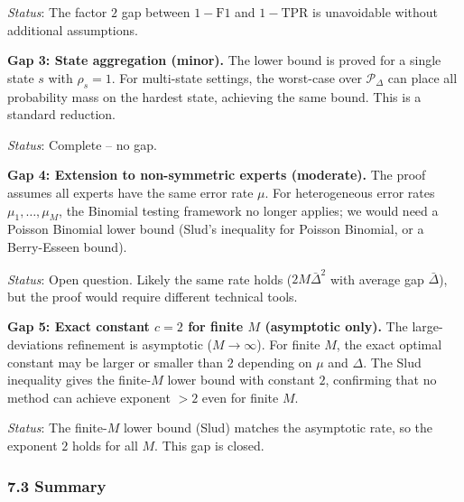 \documentclass[
  12pt,
]{article}
\begin{document}
\emph{Status}: The factor \(2\) gap between \(1-\text{F1}\) and
\(1-\text{TPR}\) is unavoidable without additional assumptions.

\textbf{Gap 3: State aggregation (minor).} The lower bound is proved for
a single state \(s\) with \(\rho_s = 1\). For multi-state settings, the
worst-case over \(\mathcal{P}_\Delta\) can place all probability mass on
the hardest state, achieving the same bound. This is a standard
reduction.

\emph{Status}: Complete -- no gap.

\textbf{Gap 4: Extension to non-symmetric experts (moderate).} The proof
assumes all experts have the same error rate \(\mu\). For heterogeneous
error rates \(\mu_1,\dots,\mu_M\), the Binomial testing framework no
longer applies; we would need a Poisson Binomial lower bound (Slud's
inequality for Poisson Binomial, or a Berry-Esseen bound).

\emph{Status}: Open question. Likely the same rate holds
(\(2M\bar{\Delta}^2\) with average gap \(\bar{\Delta}\)), but the proof
would require different technical tools.

\textbf{Gap 5: Exact constant \(c = 2\) for finite \(M\) (asymptotic
only).} The large-deviations refinement is asymptotic
(\(M \to \infty\)). For finite \(M\), the exact optimal constant may be
larger or smaller than \(2\) depending on \(\mu\) and \(\Delta\). The
Slud inequality gives the finite-\(M\) lower bound with constant \(2\),
confirming that no method can achieve exponent \(> 2\) even for finite
\(M\).

\emph{Status}: The finite-\(M\) lower bound (Slud) matches the
asymptotic rate, so the exponent \(2\) holds for all \(M\). This gap is
closed.

\subsubsection{7.3 Summary}\label{summary}
\end{document}
